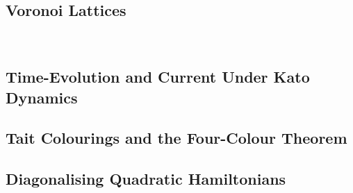 \begin{refsection}
    \chapter{Voronoi Lattices} \label{apx:voronoi}
    
    \printbibliography[heading=subbibintoc]
\end{refsection}\

\begin{refsection}
    \chapter{Time-Evolution and Current Under Kato Dynamics}
    
    
    \printbibliography[heading=subbibintoc]
\end{refsection}

\begin{refsection}
    \chapter{Tait Colourings and the Four-Colour Theorem}
    
    \printbibliography[heading=subbibintoc]
\end{refsection}

\begin{refsection}
    \chapter{Diagonalising Quadratic Hamiltonians}
    
    \printbibliography[heading=subbibintoc]
\end{refsection}
